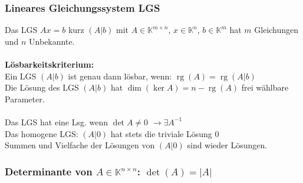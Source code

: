 \documentclass[6pt,a4paper]{scrartcl}
\DeclareMathOperator{\rg}{rg}
\begin{document}
\begin{multicols*}{4}
\subsubsection{Lineares Gleichungssystem LGS}
Das LGS $Ax=b$ kurz $(A|b)$ mit $A\in \mathbb K^{m\times n}$, $x\in \mathbb K^n$, $b\in \mathbb K^m$ hat $m$ Gleichungen und $n$ Unbekannte.\\
\\
\textbf{Lösbarkeitskriterium:}\\
Ein LGS $(A|b)$ ist genau dann lösbar, wenn: $\rg(A)=\rg(A|b)$\\
Die Lösung des LGS $(A|b)$ hat $\dim(\ker A) = n-\rg(A)$ frei wählbare Parameter.\\
\\
Das LGS hat eine Lsg. wenn $\det A \not= 0$ \quad $\rightarrow \exists A^{-1}$ \\
Das homogene LGS: $(A|0)$ hat stets die triviale Lösung $0$\\
Summen und Vielfache der Lösungen von $(A|0)$ sind wieder Lösungen.

\subsubsection{Determinante von $A\in \mathbb K^{n\times n}$: $\det(A)=|A|$}


\end{multicols*}
\end{document}
